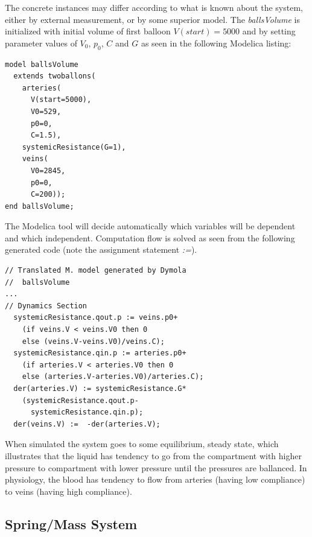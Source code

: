 \documentclass[letterpaper, 10 pt, conference]{ieeeconf}  %
\begin{document}
The concrete instances may differ according to what is known about the system, either by external measurement, or by some superior model. The \emph{ballsVolume} is initialized with initial volume of first balloon $V(start) = 5000$ and by setting parameter values of $V_0$, $p_0$, $C$ and $G$ as seen in the following Modelica listing:

\begin{lstlisting}[language=modelica]
model ballsVolume
  extends twoballons(
    arteries(
      V(start=5000),
      V0=529,
      p0=0,
      C=1.5),
    systemicResistance(G=1),
    veins(
      V0=2845,
      p0=0,
      C=200));
end ballsVolume;
\end{lstlisting}

The Modelica tool will decide automatically which variables will be dependent and which independent. Computation flow is solved as seen from the following generated code (note the assignment statement \emph{:=}).
\begin{lstlisting}[language=modelica]
// Translated M. model generated by Dymola  
//  ballsVolume
...
// Dynamics Section
  systemicResistance.qout.p := veins.p0+
    (if veins.V < veins.V0 then 0 
    else (veins.V-veins.V0)/veins.C);
  systemicResistance.qin.p := arteries.p0+
    (if arteries.V < arteries.V0 then 0
    else (arteries.V-arteries.V0)/arteries.C);
  der(arteries.V) := systemicResistance.G*
    (systemicResistance.qout.p-
      systemicResistance.qin.p);
  der(veins.V) :=  -der(arteries.V);
\end{lstlisting}

When simulated the system goes to some equilibrium, steady state, which illustrates  that the liquid has tendency to go from the compartment with higher pressure to compartment with lower pressure until the pressures are ballanced. In physiology, the blood has tendency to flow from arteries (having low compliance) to veins (having high compliance).

\subsection{Spring/Mass System}
\end{document}
